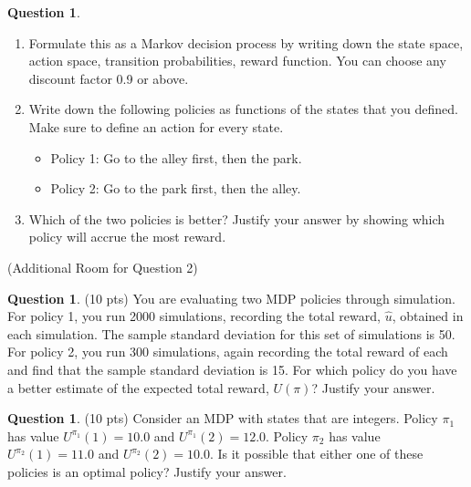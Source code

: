 \documentclass{article}
\theoremstyle{definition}
\newtheorem{question}[thm]{Question}
\begin{document}
\begin{question}
    \begin{enumerate}[label=\alph*)]
        \item Formulate this as a Markov decision process by writing down the state space, action space, transition probabilities, reward function. You can choose any discount factor 0.9 or above.
        \item Write down the following policies as functions of the states that you defined. Make sure to define an action for every state.
        \begin{itemize}[noitemsep]
            \item Policy 1: Go to the alley first, then the park.
            \item Policy 2: Go to the park first, then the alley.
        \end{itemize}
        \item Which of the two policies is better? Justify your answer by showing which policy will accrue the most reward.
    \end{enumerate}
\end{question}

\clearpage

(Additional Room for Question 2)

\clearpage

\begin{question} (10 pts)
You are evaluating two MDP policies through simulation. For policy 1, you run 2000 simulations, recording the total reward, $\hat{u}$, obtained in each simulation. The sample standard deviation for this set of simulations is 50. For policy 2, you run 300 simulations, again recording the total reward of each and find that the sample standard deviation is 15. For which policy do you have a better estimate of the expected total reward, $U(\pi)$? Justify your answer.
\end{question}

\vspace{10cm}

\begin{question} (10 pts)
Consider an MDP with states that are integers. Policy $\pi_1$ has value $U^{\pi_1}(1) = 10.0$ and $U^{\pi_1}(2) = 12.0$. Policy $\pi_2$ has value $U^{\pi_2}(1) = 11.0$ and $U^{\pi_2}(2) = 10.0$. Is it possible that either one of these policies is an optimal policy? Justify your answer.
\end{question}
\end{document}
